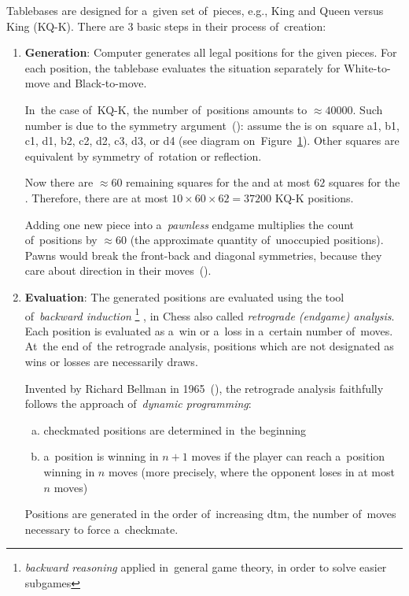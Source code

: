 Tablebases are designed for a~given set of~pieces, e.g., \king King and \queen Queen versus \kingB King (KQ-K).
There are 3 basic steps in their process of~creation:
\begin{enumerate}[1]
    \setlength\itemsep{-.5ex}
  \item \textbf{Generation}:
    Computer generates all legal positions for the given pieces.
    For each position, the tablebase evaluates the situation separately for White-to-move and Black-to-move.

    In~the case of~KQ-K, the number of~positions amounts to $\approx 40000$.
    Such number is due to the symmetry argument~(\cite{Levy2009computers}):
    assume the \kingB{} is on~square a1, b1, c1, d1, b2, c2, d2, c3, d3, or d4 (see diagram on~Figure~\ref{fig:non-symmetric-black-king}).
    Other squares are equivalent by symmetry of~rotation or reflection.

    Now there are $\approx 60$ remaining squares for the \king{} and at most $62$ squares for the \queen.
    Therefore, there are at most $10 \times 60 \times 62 = 37200$ KQ-K positions.
    \begin{figure}[H]
      \centering
      \newgame
      \showboard
      \label{fig:non-symmetric-black-king}
    \end{figure}

    Adding one new piece into a~\emph{pawnless} endgame multiplies the count of~positions by $\approx 60$ (the approximate quantity of~unoccupied positions).
    Pawns would break the front-back and diagonal symmetries, because they care about direction in their moves~(\cite{Muller2006EGTB}).

  \item \textbf{Evaluation}:
    The generated positions are evaluated using the tool of~\emph{backward induction}%
    \footnote{\emph{backward reasoning} applied in~general game theory, in order to solve easier subgames}
    , in Chess also called \emph{retrograde (endgame) analysis}.
    Each position is evaluated as a~win or a~loss in a~certain number of~moves.
    At~the end of~the retrograde analysis, positions which are not designated as wins or losses are necessarily draws.

    Invented by Richard Bellman in 1965~(\cite{Bellman1965application}), the retrograde analysis faithfully follows the approach of~\emph{dynamic programming}:
    \begin{enumerate}[(a)]
      \item checkmated positions are determined in~the beginning
      \item a~position is winning in $n+1$ moves if the player can reach a~position winning in $n$ moves (more precisely, where the opponent loses in at most $n$ moves)
    \end{enumerate}
    Positions are generated in the order of~increasing \acrfull{dtm}, the number of~moves necessary to force a~checkmate.


\end{enumerate}
